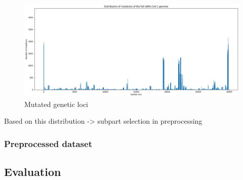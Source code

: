 \begin{figure}[ht]
	\centering
	\includegraphics[width=1.0\linewidth]{figures/mutatedGeneticLoci.png}
	\caption{Mutated genetic loci \cite{own representation}}
	\label{mutatedGeneticLoci}
\end{figure}

Based on this distribution -> subpart selection in preprocessing


\subsubsection{Preprocessed dataset}  \label{ch:experimentsAb}



\subsection{Evaluation}  \label{ch:experimentsB}



\newpage
